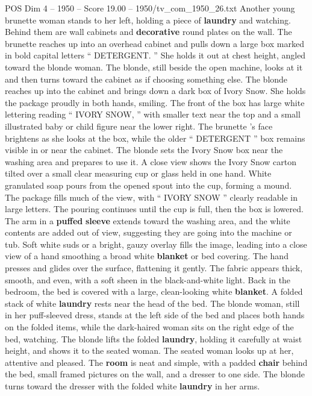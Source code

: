\begin{textsample}{POS Dim 4 – 1950 – Score 19.00 – 1950/tv\_com\_1950\_26.txt}
Another young brunette woman stands to her left, holding a piece of \textbf{laundry} and watching.
Behind them are wall cabinets and \textbf{decorative} round plates on the wall.
The brunette reaches up into an overhead cabinet and pulls down a large box marked in bold capital letters “ DETERGENT. ” She holds it out at chest height, angled toward the blonde woman.
The blonde, still beside the open machine, looks at it and then turns toward the cabinet as if choosing something else.
The blonde reaches up into the cabinet and brings down a dark box of Ivory Snow.
She holds the package proudly in both hands, smiling.
The front of the box has large white lettering reading “ IVORY SNOW, ” with smaller text near the top and a small illustrated baby or child figure near the lower right.
The brunette ’s face brightens as she looks at the box, while the older “ DETERGENT ” box remains visible in or near the cabinet.
The blonde sets the Ivory Snow box near the washing area and prepares to use it.
A close view shows the Ivory Snow carton tilted over a small clear measuring cup or glass held in one hand.
White granulated soap pours from the opened spout into the cup, forming a mound.
The package fills much of the view, with “ IVORY SNOW ” clearly readable in large letters.
The pouring continues until the cup is full, then the box is lowered.
The arm in a \textbf{puffed} \textbf{sleeve} extends toward the washing area, and the white contents are added out of view, suggesting they are going into the machine or tub.
Soft white suds or a bright, gauzy overlay fills the image, leading into a close view of a hand smoothing a broad white \textbf{blanket} or bed covering.
The hand presses and glides over the surface, flattening it gently.
The fabric appears thick, smooth, and even, with a soft sheen in the black-and-white light.
Back in the bedroom, the bed is covered with a large, clean-looking white \textbf{blanket}.
A folded stack of white \textbf{laundry} rests near the head of the bed.
The blonde woman, still in her puff-sleeved dress, stands at the left side of the bed and places both hands on the folded items, while the dark-haired woman sits on the right edge of the bed, watching.
The blonde lifts the folded \textbf{laundry}, holding it carefully at waist height, and shows it to the seated woman.
The seated woman looks up at her, attentive and pleased.
The \textbf{room} is neat and simple, with a padded \textbf{chair} behind the bed, small framed pictures on the wall, and a dresser to one side.
The blonde turns toward the dresser with the folded white \textbf{laundry} in her arms.

\end{textsample}
